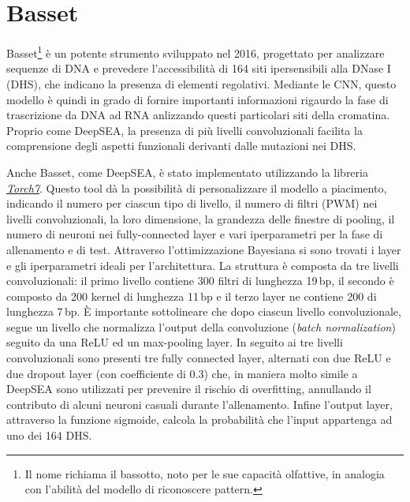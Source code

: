 \begin{comment}
Ogni training sample consisteva nel 1000\,bp sequences, centrata sul frammento (bin) di 200 basi ed associata al vettore di etichette che ontiene le 919 features. In questo modo, le due sequenze di 400 \,bp ai lati davaano più contesto in modo da interpretare meglio il risultato.

\end{comment}






\section{Basset}\label{sec:Basset}
% 
Basset\footnote{Il nome richiama il bassotto, noto per le sue capacità olfattive, in analogia con l'abilità del modello di riconoscere pattern.} è un potente strumento sviluppato nel 2016, progettato per analizzare sequenze di DNA e prevedere l'accessibilità di 164 siti ipersensibili alla DNase I (\acs{DHS}), che indicano la presenza di elementi regolativi. Mediante le \acs{CNN}, questo modello è quindi in grado di fornire importanti informazioni rigaurdo la fase di trascrizione da \acs{DNA} ad \acs{RNA} anlizzando questi particolari siti della cromatina. Proprio come DeepSEA, la presenza di più livelli convoluzionali facilita la comprensione degli aspetti funzionali derivanti dalle mutazioni nei \acs{DHS}.

Anche Basset, come DeepSEA, è stato implementato utilizzando la libreria \href{https://github.com/torch/torch7}{\textsl{Torch7}}. Questo tool dà la possibilità di personalizzare il modello a piacimento, indicando il numero per ciascun tipo di livello, il numero di filtri (\acs{PWM}) nei livelli convoluzionali, la loro dimensione, la grandezza delle finestre di pooling, il numero di neuroni nei fully-connected layer e vari iperparametri per la fase di allenamento e di test. Attraverso l'ottimizzazione Bayesiana si sono trovati i layer e gli iperparametri ideali per l'architettura. La struttura è composta da tre livelli convoluzionali: il primo livello contiene 300 filtri di lunghezza 19\,bp, il secondo è composto da 200 kernel di lunghezza 11\,bp e il terzo layer ne contiene 200 di lunghezza 7\,bp. È importante sottolineare che dopo ciascun livello convoluzionale, segue un livello che normalizza l'output della convoluzione (\textit{batch normalization}) seguito da una \acs{ReLU} ed un max-pooling layer. In seguito ai tre livelli convoluzionali sono presenti tre fully connected layer, alternati con due \acs{ReLU} e due dropout layer (con coefficiente di 0.3) che, in maniera molto simile a DeepSEA sono utilizzati per prevenire il rischio di overfitting, annullando il contributo di alcuni neuroni casuali durante l'allenamento. Infine l'output layer, attraverso la funzione sigmoide, calcola la probabilità che l'input appartenga ad uno dei 164 \acs{DHS}.

